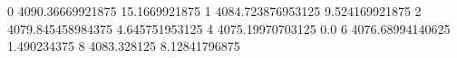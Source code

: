0 4090.36669921875 15.1669921875
1 4084.723876953125 9.524169921875
2 4079.845458984375 4.645751953125
4 4075.19970703125 0.0
6 4076.68994140625 1.490234375
8 4083.328125 8.12841796875
